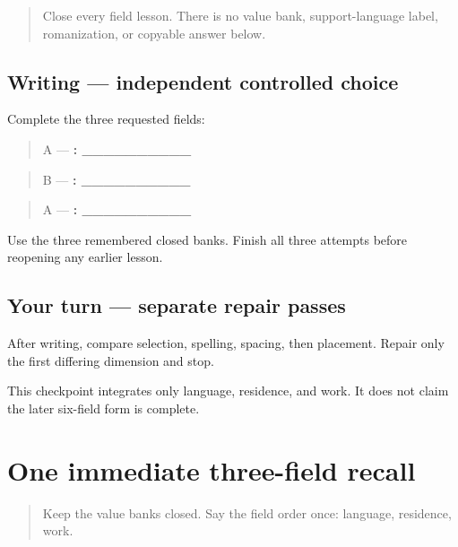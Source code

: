 \begin{quote}
Close every field lesson. There is no value bank, support-language label, romanization, or copyable answer below.
\end{quote}

\subsection*{Writing — independent controlled choice}
Complete the three requested fields:

\begin{quote}
A — \textbf{: \_\_\_\_\_\_\_\_\_\_}
\end{quote}

\begin{quote}
B — \textbf{: \_\_\_\_\_\_\_\_\_\_}
\end{quote}

\begin{quote}
A — \textbf{: \_\_\_\_\_\_\_\_\_\_}
\end{quote}

Use the three remembered closed banks. Finish all three attempts before reopening any earlier lesson.

\subsection*{Your turn — separate repair passes}
After writing, compare selection, spelling, spacing, then placement. Repair only the first differing dimension and stop.

\begin{tcolorbox}[breakable,colback=teal!4,colframe=teal!35!black,title={Before you move on}]
This checkpoint integrates only language, residence, and work. It does not claim the later six-field form is complete.
\end{tcolorbox}
\section[\texorpdfstring{\pa{ਭਾਸ਼ਾ}: \_\_\_\_\_\_ … (three-field …)}{ਭਾਸ਼ਾ: \_\_\_\_\_\_ … (three-field …)}]{One immediate three-field recall}

\label{lesson:PA-R23-three-no-model-r1}



\begin{quote}
Keep the value banks closed. Say the field order once: language, residence, work.
\end{quote}


